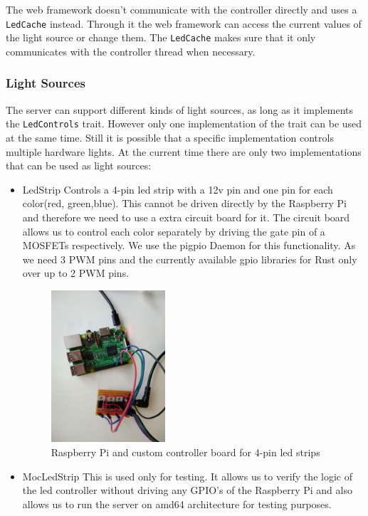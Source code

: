 \documentclass[conference]{IEEEtran}
\begin{document}
The web framework doesn't communicate with the controller directly and uses a \texttt{LedCache} instead. Through it the web
framework can access the current values of the light source or change them. The \texttt{LedCache} makes sure that it only communicates
with the controller thread when necessary.


\subsubsection{Light Sources}
The server can support different kinds of light sources, as long as it implements the \texttt{LedControls} trait. However only one
implementation of the trait can be used at the same time. Still it is possible that a specific implementation controls multiple
hardware lights. At the current time there are only two implementations that can be used as light sources:

\begin{itemize}
   \item LedStrip
   Controls a 4-pin led strip with a 12v pin and one pin for each color(red, green,blue). This cannot be driven directly by the
   Raspberry Pi and therefore we need to use a extra circuit board\cite{rpiled} for it. The circuit board allows us to control each
   color separately by driving the gate pin of a MOSFETs respectively. We use the pigpio Daemon\cite{pigpiod} for this functionality.
   As we need 3 PWM pins and the currently available gpio libraries for Rust only over up to 2 PWM pins.
  
   \begin{figure}[H]
       \centering
       \includegraphics[width=0.4\textwidth]{board}
       \caption{Raspberry Pi and custom controller board for 4-pin led strips}
   \end{figure}

   \item MocLedStrip
   This is used only for testing. It allows us to verify the logic of the led controller without driving any GPIO's of the
   Raspberry Pi and also allows us to run the server on amd64 architecture for testing purposes.
\end{itemize}
\end{document}
